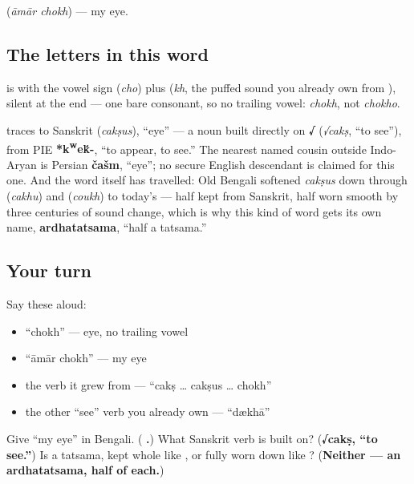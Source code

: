 \textbf{ } (\emph{āmār chokh}) — my eye.

\subsection*{The letters in this word}
\textbf{} is \textbf{} with the vowel sign \textbf{} (\emph{cho}) plus \textbf{} (\emph{kh}, the puffed sound you already own from ), silent at the end — one bare consonant, so no trailing vowel: \emph{chokh}, not \emph{chokho}.

\begin{cousinweb}
\textbf{} traces to Sanskrit \textbf{} (\emph{cakṣus}), \textquotedblleft{}eye\textquotedblright{} — a noun built directly on \textbf{√} (\emph{√cakṣ}, \textquotedblleft{}to see\textquotedblright{}), from PIE \textbf{*k\textsuperscript{w}e\'{k}-}, \textquotedblleft{}to appear, to see.\textquotedblright{} The nearest named cousin outside Indo-Aryan is Persian \textbf{čašm}, \textquotedblleft{}eye\textquotedblright{}; no secure English descendant is claimed for this one. And the word itself has travelled: Old Bengali softened \emph{cakṣus} down through \textbf{} (\emph{cakhu}) and \textbf{} (\emph{coukh}) to today's \textbf{} — half kept from Sanskrit, half worn smooth by three centuries of sound change, which is why this kind of word gets its own name, \textbf{ardhatatsama}, \textquotedblleft{}half a tatsama.\textquotedblright{}
\end{cousinweb}

\subsection*{Your turn}
Say these aloud:

\begin{itemize}
\raggedright
  \item \textquotedblleft{}chokh\textquotedblright{} — eye, no trailing vowel
  \item \textquotedblleft{}āmār chokh\textquotedblright{} — my eye
  \item the verb it grew from — \textquotedblleft{}cakṣ … cakṣus … chokh\textquotedblright{}
  \item the other \textquotedblleft{}see\textquotedblright{} verb you already own — \textquotedblleft{}dækhā\textquotedblright{}
\end{itemize}

\begin{tcolorbox}[breakable,colback=teal!4,colframe=teal!35!black,title={Before you move on}]
Give \textquotedblleft{}my eye\textquotedblright{} in Bengali. (\textbf{ .}) What Sanskrit verb is  built on? (\textbf{√cakṣ, \textquotedblleft{}to see.\textquotedblright{}}) Is  a tatsama, kept whole like , or fully worn down like ? (\textbf{Neither — an ardhatatsama, half of each.})
\end{tcolorbox}
